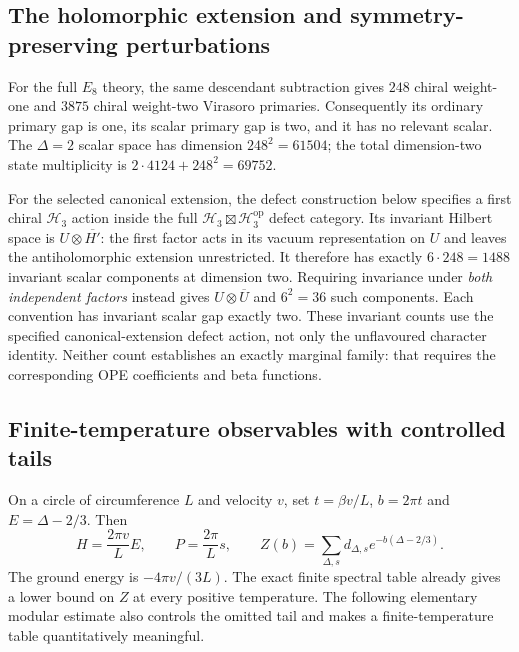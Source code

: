 \documentclass[11pt,a4paper]{article}
\theoremstyle{definition}
\begin{document}
\subsection{The holomorphic extension and symmetry-preserving perturbations}

For the full $E_8$ theory, the same descendant subtraction gives
$248$ chiral weight-one and $3875$ chiral weight-two Virasoro
primaries.  Consequently its ordinary primary gap is one, its scalar
primary gap is two, and it has no relevant scalar.  The
$\Delta=2$ scalar space has dimension $248^2=61504$; the total
dimension-two state multiplicity is
$2\cdot4124+248^2=69752$.

For the selected canonical extension, the defect construction below
specifies a first chiral $\mathcal H_3$ action inside the full
$\mathcal H_3\boxtimes\mathcal H_3^{\mathrm{op}}$ defect category.
Its invariant Hilbert space is
$U\otimes\overline{H'}$: the first factor acts in its vacuum
representation on $U$ and leaves the antiholomorphic extension
unrestricted.  It therefore has exactly $6\cdot248=1488$ invariant
scalar components at dimension two.  Requiring invariance under
\emph{both independent factors} instead gives
$U\otimes\overline U$ and $6^2=36$ such components.  Each convention
has invariant scalar gap exactly two.  These invariant counts use
the specified canonical-extension defect action, not only the
unflavoured character identity.  Neither count establishes an exactly
marginal family: that requires the corresponding OPE coefficients
and beta functions.

\subsection{Finite-temperature observables with controlled tails}

On a circle of circumference $L$ and velocity $v$, set
$t=\beta v/L$, $b=2\pi t$ and $E=\Delta-2/3$.  Then
\[
 H=\frac{2\pi v}{L}E,\qquad
 P=\frac{2\pi}{L}s,\qquad
 Z(b)=\sum_{\Delta,s}d_{\Delta,s}e^{-b(\Delta-2/3)}.
\]
The ground energy is $-4\pi v/(3L)$.  The exact finite spectral table
already gives a lower bound on $Z$ at every positive temperature.
The following elementary modular estimate also controls the omitted
tail and makes a finite-temperature table quantitatively meaningful.
\end{document}

